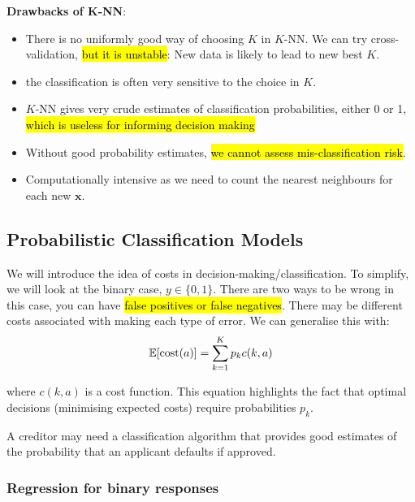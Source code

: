 \documentclass[11pt]{article}
\begin{document}
\begin{shaded}
    \textbf{Drawbacks of K-NN}:

    \begin{itemize}
        \item There is no uniformly good way of choosing $K$ in $K$-NN. We can try cross-validation, \hl{but it is unstable}: New data is likely to lead to new best $K$. 
        \item the classification is often very sensitive to the choice in $K$.
        \item $K$-NN gives very crude estimates of classification probabilities, either 0 or 1, \hl{which is useless for informing decision making}
        \item Without good probability estimates, \hl{we cannot assess mis-classification risk}.
        \item Computationally intensive as we need to count the nearest neighbours for each new $\mathbf{x}$.
    \end{itemize}
    
\end{shaded}

\subsection{Probabilistic Classification Models}

We will introduce the idea of costs in decision-making/classification. To simplify, we will look at the binary case, $y \in \{0,1\}$. There are two ways to be wrong in this case, you can have \hl{false positives or false negatives}. There may be different costs associated with making each type of error. We can generalise this with:
\begin{equation}
    \mathbb{E}[\operatorname{cost}(a)] = \sum_{k=1}^K p_k c(k,a)
\end{equation}

where $c(k,a)$ is a cost function. This equation highlights the fact that optimal decisions (minimising expected costs) require probabilities $p_k$.

\begin{example}
    A creditor may need a classification algorithm that provides good estimates of the probability that an applicant defaults if approved.
\end{example}

\subsubsection{Regression for binary responses}
\end{document}
